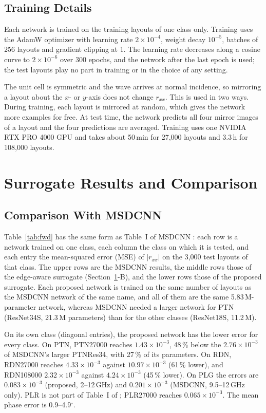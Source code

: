 \documentclass[journal]{IEEEtran}
\newcommand{\e}[2]{#1{\times}10^{#2}}
\begin{document}
\subsection{Training Details}
Each network is trained on the training layouts of one class only. Training uses the AdamW optimizer \cite{adamw} with learning rate $\e{2}{-4}$, weight decay $10^{-5}$, batches of 256 layouts and gradient clipping at 1. The learning rate decreases along a cosine curve to $\e{2}{-6}$ over 300 epochs, and the network after the last epoch is used; the test layouts play no part in training or in the choice of any setting.

The unit cell is symmetric and the wave arrives at normal incidence, so mirroring a layout about the $x$- or $y$-axis does not change $r_{xx}$. This is used in two ways. During training, each layout is mirrored at random, which gives the network more examples for free. At test time, the network predicts all four mirror images of a layout and the four predictions are averaged. Training uses one NVIDIA RTX PRO 4000 GPU and takes about 50\,min for 27,000 layouts and 3.3\,h for 108,000 layouts.

\section{Surrogate Results and Comparison}\label{sec:fwdresults}

\subsection{Comparison With MSDCNN}
Table~\ref{tab:fwd} has the same form as Table~I of MSDCNN \cite{msdcnn}: each row is a network trained on one class, each column the class on which it is tested, and each entry the mean-squared error (MSE) of $|r_{xx}|$ on the 3,000 test layouts of that class. The upper rows are the MSDCNN results, the middle rows those of the edge-aware surrogate (Section~\ref{sec:fwdresults}-B), and the lower rows those of the proposed surrogate. Each proposed network is trained on the same number of layouts as the MSDCNN network of the same name, and all of them are the same 5.83\,M-parameter network, whereas MSDCNN needed a larger network for PTN (ResNet34S, 21.3\,M parameters) than for the other classes (ResNet18S, 11.2\,M).

On its own class (diagonal entries), the proposed network has the lower error for every class. On PTN, PTN27000 reaches $\e{1.43}{-3}$, 48\,\% below the $\e{2.76}{-3}$ of MSDCNN's larger PTNRes34, with 27\,\% of its parameters. On RDN, RDN27000 reaches $\e{4.33}{-3}$ against $\e{10.97}{-3}$ (61\,\% lower), and RDN108000 $\e{2.32}{-3}$ against $\e{4.24}{-3}$ (45\,\% lower). On PLG the errors are $\e{0.083}{-3}$ (proposed, 2--12\,GHz) and $\e{0.201}{-3}$ (MSDCNN, 9.5--12\,GHz only). PLR is not part of Table~I of \cite{msdcnn}; PLR27000 reaches $\e{0.065}{-3}$. The mean phase error is 0.9--4.9$^\circ$.
\end{document}
